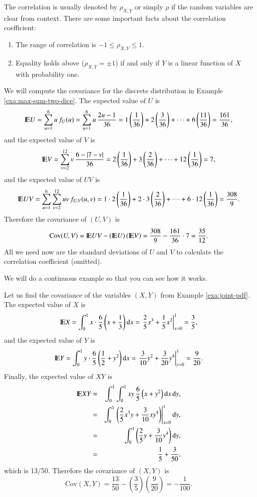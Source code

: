 \documentclass[captions=tableheading]{scrbook}
\begin{document}
The correlation is usually denoted by \(\rho_{X,Y}\) or simply \(\rho\) if the random variables are clear from context. There are some important facts about the correlation coefficient: 
\begin{enumerate}
\item The range of correlation is \(-1\leq\rho_{X,Y}\leq1\).
\item Equality holds above (\(\rho_{X,Y}=\pm1\)) if and only if \(Y\) is a linear function of \(X\) with probability one.
\end{enumerate}

\begin{example}
\label{exa:max-sum-dice-covariance}

We will compute the covariance for the discrete distribution in Example \ref{exa:max-sum-two-dice}. The expected value of \(U\) is
\[
\mathrm{I\hspace{-1.5pt}E} U=\sum_{u=1}^{6}u\, f_{U}(u)=\sum_{u=1}^{6}u\,\frac{2u-1}{36}=1\left(\frac{1}{36}\right)+2\left(\frac{3}{36}\right)+\cdots+6\left(\frac{11}{36}\right)=\frac{161}{36},
\]
and the expected value of \(V\) is
\[
\mathrm{I\hspace{-1.5pt}E} V=\sum_{v=2}^{12}v\,\frac{6-|7-v|}{36}=2\left(\frac{1}{36}\right)+3\left(\frac{2}{36}\right)+\cdots+12\left(\frac{1}{36}\right)=7,
\]
and the expected value of \(UV\) is
\[
\mathrm{I\hspace{-1.5pt}E} UV=\sum_{u=1}^{6}\sum_{v=2}^{12}uv\, f_{U,V}(u,v)=1\cdot2\left(\frac{1}{36}\right)+2\cdot3\left(\frac{2}{36}\right)+\cdots+6\cdot12\left(\frac{1}{36}\right)=\frac{308}{9}.
\]
Therefore the covariance of \((U,V)\) is
\[
\mbox{Cov}(U,V)=\mathrm{I\hspace{-1.5pt}E} UV-\left(\mathrm{I\hspace{-1.5pt}E} U\right)\left(\mathrm{I\hspace{-1.5pt}E} V\right)=\frac{308}{9}-\frac{161}{36}\cdot7=\frac{35}{12}.
\]
All we need now are the standard deviations of \(U\) and \(V\) to calculate the correlation coefficient (omitted).
\end{example}

We will do a continuous example so that you can see how it works.

\begin{example}

Let us find the covariance of the variables \((X,Y)\) from Example \ref{exa:joint-pdf}. The expected value of \(X\) is
\[
\mathrm{I\hspace{-1.5pt}E} X=\int_{0}^{1}x\cdot\frac{6}{5}\left(x+\frac{1}{3}\right)\mathrm{d} x=\left.\frac{2}{5}x^{3}+\frac{1}{5}x^{2}\right|_{x=0}^{1}=\frac{3}{5},
\]
and the expected value of \(Y\) is
\[
\mathrm{I\hspace{-1.5pt}E} Y=\int_{0}^{1}y\cdot\frac{6}{5}\left(\frac{1}{2}+y^{2}\right)\mathrm{d} x=\left.\frac{3}{10}y^{2}+\frac{3}{20}y^{4}\right|_{y=0}^{1}=\frac{9}{20}.
\]
Finally, the expected value of \(XY\) is
\begin{eqnarray*}
\mathrm{I\hspace{-1.5pt}E} XY & = & \int_{0}^{1}\int_{0}^{1}xy\,\frac{6}{5}\left(x+y^{2}\right)\mathrm{d} x\,\mathrm{d} y,\\
 & = & \int_{0}^{1}\left.\left(\frac{2}{5}x^{3}y+\frac{3}{10}xy^{4}\right)\right|_{x=0}^{1}\mathrm{d} y,\\
 & = & \int_{0}^{1}\left(\frac{2}{5}y+\frac{3}{10}y^{4}\right)\mathrm{d} y,\\
 & = & \frac{1}{5}+\frac{3}{50},
\end{eqnarray*}
which is 13/50. Therefore the covariance of \((X,Y)\) is
\[
\mbox{Cov}(X,Y)=\frac{13}{50}-\left(\frac{3}{5}\right)\left(\frac{9}{20}\right)=-\frac{1}{100}.
\]
\end{example}
\end{document}
